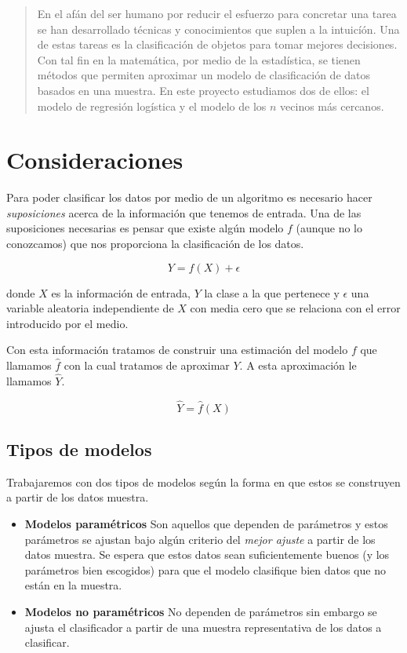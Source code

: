 \documentclass[11pt,letterpaper,reqno]{article}
\begin{document}
\pagebreak
\pagestyle{plain}

\begin{abstract}
En el afán del ser humano por reducir el esfuerzo para concretar una tarea se han desarrollado técnicas y conocimientos que suplen a la intuicíón. Una de estas tareas es la clasificación de objetos para tomar mejores decisiones. Con tal fin en la matemática, por medio de la estadística, se tienen métodos que permiten aproximar un modelo de clasificación de datos basados en una muestra. En este proyecto estudiamos dos de ellos: el modelo de regresión logística y el modelo de los $n$ vecinos más cercanos.
\end{abstract}

\section{Consideraciones}

Para poder clasificar los datos por medio de un algoritmo es necesario hacer \textit{suposiciones} acerca de la información que tenemos de entrada. Una de las suposiciones necesarias es pensar que existe algún modelo $f$ (aunque no lo conozcamos) que nos proporciona la clasificación de los datos.

$$
Y = f(X) + \epsilon
$$

donde $X$ es la información de entrada, $Y$ la clase a la que pertenece y $\epsilon$  una variable aleatoria independiente de $X$ con media cero que se relaciona con el error introducido por el medio.

Con esta información tratamos de construir una estimación del modelo $f$ que llamamos $\hat{f}$ con la cual tratamos de aproximar $Y$. A esta aproximación le llamamos $\hat{Y}$.

$$
\hat{Y} = \hat{f}(X)
$$

\subsection{Tipos de modelos}

Trabajaremos con dos tipos de modelos según la forma en que estos se construyen a partir de los datos muestra.

\begin{itemize}
	\item \textbf{Modelos paramétricos} Son aquellos que dependen de parámetros y estos parámetros se ajustan bajo algún criterio del \textit{mejor ajuste} a partir de los datos muestra. Se espera que estos datos sean suficientemente buenos (y los parámetros bien escogidos) para que el modelo clasifique bien datos que no están en la muestra.
	\item \textbf{Modelos no paramétricos} No dependen de parámetros sin embargo se ajusta el clasificador a partir de una muestra representativa de los datos a clasificar.
\end{itemize}
\end{document}
